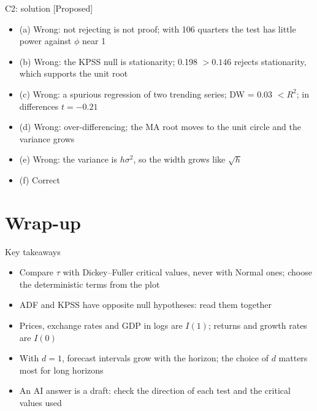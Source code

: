 \ifsolutions
\begin{frame}{C2: solution [Proposed]}
\itemsize{\scriptsize}
\begin{itemize}
    \item (a) Wrong: not rejecting is not proof; with 106 quarters the test has little power against $\phi$ near 1
    \item (b) Wrong: the KPSS null is stationarity; 0.198 $> 0.146$ rejects stationarity, which supports the unit root
    \item (c) Wrong: a spurious regression of two trending series; DW = 0.03 $< R^2$; in differences $t = -0.21$
    \item (d) Wrong: over-differencing; the MA root moves to the unit circle and the variance grows
    \item (e) Wrong: the variance is $h\sigma^2$, so the width grows like $\sqrt{h}$
    \item (f) Correct
\end{itemize}
\end{frame}
\fi


\section{Wrap-up}

\begin{frame}{Key takeaways}
\itemsize{\small}
\begin{itemize}
    \item Compare $\tau$ with Dickey--Fuller critical values, never with Normal ones; choose the deterministic terms from the plot
    \item ADF and KPSS have opposite null hypotheses: read them together
    \item Prices, exchange rates and GDP in logs are $I(1)$; returns and growth rates are $I(0)$
    \item With $d = 1$, forecast intervals grow with the horizon; the choice of $d$ matters most for long horizons
    \item An AI answer is a draft: check the direction of each test and the critical values used
\end{itemize}
\end{frame}

